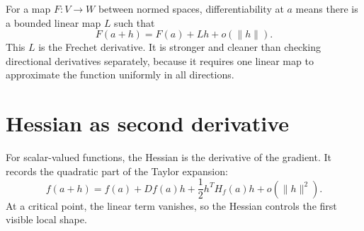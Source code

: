 For a map \(F:V\to W\) between normed spaces, differentiability at \(a\) means there is a bounded linear map \(L\) such that
\[
  F(a+h)=F(a)+Lh+o(\|h\|).
\]
This \(L\) is the Frechet derivative.  It is stronger and cleaner than checking directional derivatives separately, because it requires one linear map to approximate the function uniformly in all directions.

\section{Hessian as second derivative}

For scalar-valued functions, the Hessian is the derivative of the gradient.  It records the quadratic part of the Taylor expansion:
\[
  f(a+h)=f(a)+Df(a)h+\frac12 h^T H_f(a)h+o(\|h\|^2).
\]
At a critical point, the linear term vanishes, so the Hessian controls the first visible local shape.
